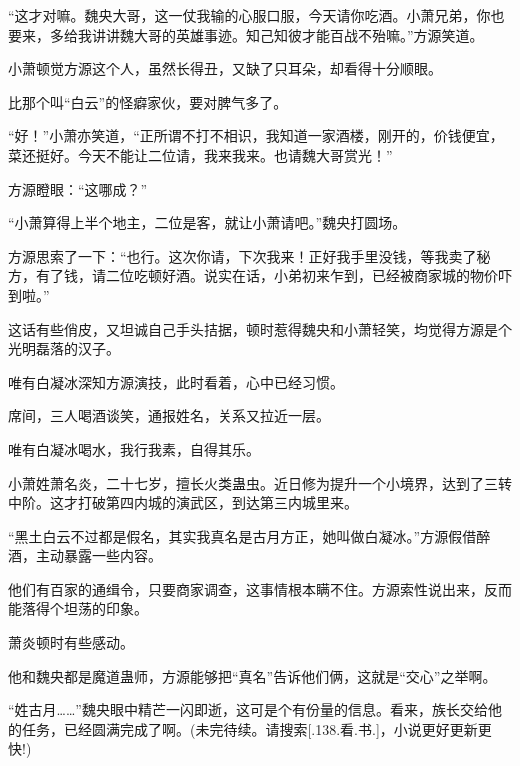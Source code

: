 \begin{this_body}
“这才对嘛。魏央大哥，这一仗我输的心服口服，今天请你吃酒。小萧兄弟，你也要来，多给我讲讲魏大哥的英雄事迹。知己知彼才能百战不殆嘛。”方源笑道。

小萧顿觉方源这个人，虽然长得丑，又缺了只耳朵，却看得十分顺眼。

比那个叫“白云”的怪癖家伙，要对脾气多了。

“好！”小萧亦笑道，“正所谓不打不相识，我知道一家酒楼，刚开的，价钱便宜，菜还挺好。今天不能让二位请，我来我来。也请魏大哥赏光！”

方源瞪眼：“这哪成？”

“小萧算得上半个地主，二位是客，就让小萧请吧。”魏央打圆场。

方源思索了一下：“也行。这次你请，下次我来！正好我手里没钱，等我卖了秘方，有了钱，请二位吃顿好酒。说实在话，小弟初来乍到，已经被商家城的物价吓到啦。”

这话有些俏皮，又坦诚自己手头拮据，顿时惹得魏央和小萧轻笑，均觉得方源是个光明磊落的汉子。

唯有白凝冰深知方源演技，此时看着，心中已经习惯。

席间，三人喝酒谈笑，通报姓名，关系又拉近一层。

唯有白凝冰喝水，我行我素，自得其乐。

小萧姓萧名炎，二十七岁，擅长火类蛊虫。近日修为提升一个小境界，达到了三转中阶。这才打破第四内城的演武区，到达第三内城里来。

“黑土白云不过都是假名，其实我真名是古月方正，她叫做白凝冰。”方源假借醉酒，主动暴露一些内容。

他们有百家的通缉令，只要商家调查，这事情根本瞒不住。方源索性说出来，反而能落得个坦荡的印象。

萧炎顿时有些感动。

他和魏央都是魔道蛊师，方源能够把“真名”告诉他们俩，这就是“交心”之举啊。

“姓古月……”魏央眼中精芒一闪即逝，这可是个有份量的信息。看来，族长交给他的任务，已经圆满完成了啊。(未完待续。请搜索[.138.看.书.]，小说更好更新更快!)

\end{this_body}

